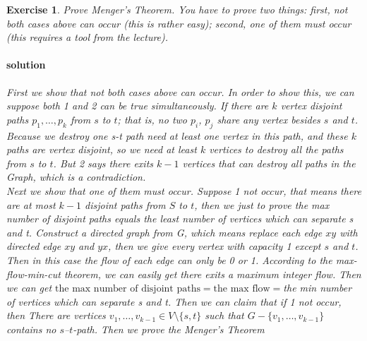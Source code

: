 \documentclass[12pt,a4]{article}
\newtheorem{exercise}[theorem]{Exercise}
\begin{document}
\begin{exercise}
   Prove Menger's Theorem. You have to prove two things: first, not both cases above can occur (this is rather easy);
   second, one of them must occur (this requires a tool from the lecture).
   
\paragraph{solution}
First we show that not both cases above can occur. In order to show this, we can suppose both 1 and 2 can be true simultaneously. If there are $k$ vertex disjoint paths $p_1,\dots,p_k$ from $s$ to $t$; that is, no two $p_i$, $p_j$ share any vertex besides $s$ and $t$. Because we destroy one s-t path need at least one vertex in this path, and these $k$ paths are vertex disjoint, so we need at least $k$ vertices to destroy all the paths from $s$ to $t$. But 2 says there exits $k-1$ vertices that can destroy all paths in the Graph, which is a contradiction.\\
Next we show that one of them must occur. Suppose 1 not occur, that means there are at most $k-1$ disjoint paths from $S$ to $t$, then we just to prove the max number of disjoint paths equals the least number of vertices which can separate s and t. Construct a directed graph from G, which means replace each edge $xy$ with directed edge $xy$ and $yx$, then we give every vertex with capacity 1 except $s$ and $t$. Then in this case the flow of each edge can only be 0 or 1. According to the max-flow-min-cut theorem, we can easily get there exits a maximum integer flow. Then we can get 
$\text{the max number of disjoint paths} = \text{the max flow} =$the min number of vertices which can separate s and t.
Then we can claim that if 1 not occur, then There are vertices $v_1,\dots,v_{k-1} \in V \setminus \{s,t\}$ such that $G - \{v_1,\dots, v_{k-1}\}$ contains no $s$--$t$-path. Then we prove the Menger's Theorem
   
\end{exercise}
\end{document}
